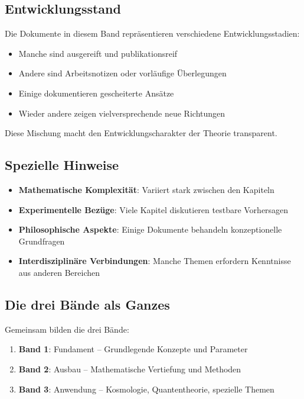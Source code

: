 \subsection*{Entwicklungsstand}

Die Dokumente in diesem Band repräsentieren verschiedene Entwicklungsstadien:

\begin{itemize}
\item Manche sind ausgereift und publikationsreif
\item Andere sind Arbeitsnotizen oder vorläufige Überlegungen
\item Einige dokumentieren gescheiterte Ansätze
\item Wieder andere zeigen vielversprechende neue Richtungen
\end{itemize}

Diese Mischung macht den Entwicklungscharakter der Theorie transparent.

\subsection*{Spezielle Hinweise}

\begin{itemize}
\item \textbf{Mathematische Komplexität}: Variiert stark zwischen den Kapiteln
\item \textbf{Experimentelle Bezüge}: Viele Kapitel diskutieren testbare Vorhersagen
\item \textbf{Philosophische Aspekte}: Einige Dokumente behandeln konzeptionelle Grundfragen
\item \textbf{Interdisziplinäre Verbindungen}: Manche Themen erfordern Kenntnisse aus anderen Bereichen
\end{itemize}

\subsection*{Die drei Bände als Ganzes}

Gemeinsam bilden die drei Bände:

\begin{enumerate}
\item \textbf{Band 1}: Fundament -- Grundlegende Konzepte und Parameter
\item \textbf{Band 2}: Ausbau -- Mathematische Vertiefung und Methoden
\item \textbf{Band 3}: Anwendung -- Kosmologie, Quantentheorie, spezielle Themen
\end{enumerate}

